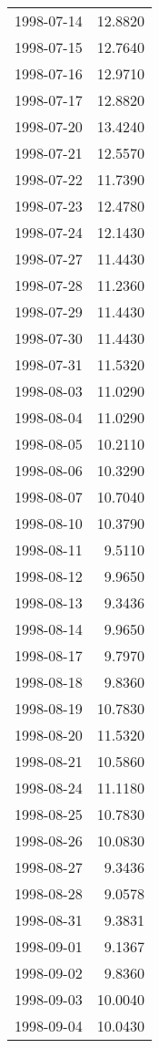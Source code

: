 \begin{tabular}{lr}
1998-07-14 &     12.8820 \\
1998-07-15 &     12.7640 \\
1998-07-16 &     12.9710 \\
1998-07-17 &     12.8820 \\
1998-07-20 &     13.4240 \\
1998-07-21 &     12.5570 \\
1998-07-22 &     11.7390 \\
1998-07-23 &     12.4780 \\
1998-07-24 &     12.1430 \\
1998-07-27 &     11.4430 \\
1998-07-28 &     11.2360 \\
1998-07-29 &     11.4430 \\
1998-07-30 &     11.4430 \\
1998-07-31 &     11.5320 \\
1998-08-03 &     11.0290 \\
1998-08-04 &     11.0290 \\
1998-08-05 &     10.2110 \\
1998-08-06 &     10.3290 \\
1998-08-07 &     10.7040 \\
1998-08-10 &     10.3790 \\
1998-08-11 &      9.5110 \\
1998-08-12 &      9.9650 \\
1998-08-13 &      9.3436 \\
1998-08-14 &      9.9650 \\
1998-08-17 &      9.7970 \\
1998-08-18 &      9.8360 \\
1998-08-19 &     10.7830 \\
1998-08-20 &     11.5320 \\
1998-08-21 &     10.5860 \\
1998-08-24 &     11.1180 \\
1998-08-25 &     10.7830 \\
1998-08-26 &     10.0830 \\
1998-08-27 &      9.3436 \\
1998-08-28 &      9.0578 \\
1998-08-31 &      9.3831 \\
1998-09-01 &      9.1367 \\
1998-09-02 &      9.8360 \\
1998-09-03 &     10.0040 \\
1998-09-04 &     10.0430 \\

\end{tabular}
